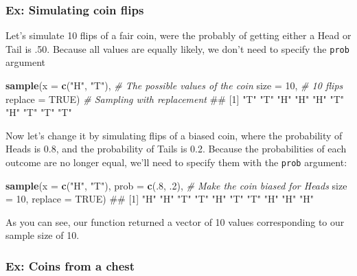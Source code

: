 \documentclass[]{book}
\newenvironment{Shaded}{\begin{snugshade}}{\end{snugshade}}
\newcommand{\KeywordTok}[1]{\textcolor[rgb]{0.13,0.29,0.53}{\textbf{{#1}}}}
\newcommand{\DataTypeTok}[1]{\textcolor[rgb]{0.13,0.29,0.53}{{#1}}}
\newcommand{\DecValTok}[1]{\textcolor[rgb]{0.00,0.00,0.81}{{#1}}}
\newcommand{\StringTok}[1]{\textcolor[rgb]{0.31,0.60,0.02}{{#1}}}
\newcommand{\CommentTok}[1]{\textcolor[rgb]{0.56,0.35,0.01}{\textit{{#1}}}}
\newcommand{\OtherTok}[1]{\textcolor[rgb]{0.56,0.35,0.01}{{#1}}}
\newcommand{\NormalTok}[1]{{#1}}
\theoremstyle{definition}
\theoremstyle{definition}
\theoremstyle{remark}
\begin{document}
\subsubsection{Ex: Simulating coin
flips}\label{ex-simulating-coin-flips}

Let's simulate 10 flips of a fair coin, were the probably of getting
either a Head or Tail is .50. Because all values are equally likely, we
don't need to specify the \texttt{prob} argument

\begin{Shaded}
\begin{Highlighting}[]
\KeywordTok{sample}\NormalTok{(}\DataTypeTok{x =} \KeywordTok{c}\NormalTok{(}\StringTok{"H"}\NormalTok{, }\StringTok{"T"}\NormalTok{), }\CommentTok{# The possible values of the coin}
       \DataTypeTok{size =} \DecValTok{10}\NormalTok{,  }\CommentTok{# 10 flips}
       \DataTypeTok{replace =} \OtherTok{TRUE}\NormalTok{) }\CommentTok{# Sampling with replacement}
\NormalTok{##  [1] "T" "T" "H" "H" "H" "T" "H" "T" "T" "T"}
\end{Highlighting}
\end{Shaded}

Now let's change it by simulating flips of a biased coin, where the
probability of Heads is 0.8, and the probability of Tails is 0.2.
Because the probabilities of each outcome are no longer equal, we'll
need to specify them with the \texttt{prob} argument:

\begin{Shaded}
\begin{Highlighting}[]
\KeywordTok{sample}\NormalTok{(}\DataTypeTok{x =} \KeywordTok{c}\NormalTok{(}\StringTok{"H"}\NormalTok{, }\StringTok{"T"}\NormalTok{),}
       \DataTypeTok{prob =} \KeywordTok{c}\NormalTok{(.}\DecValTok{8}\NormalTok{, .}\DecValTok{2}\NormalTok{), }\CommentTok{# Make the coin biased for Heads}
       \DataTypeTok{size =} \DecValTok{10}\NormalTok{,}
       \DataTypeTok{replace =} \OtherTok{TRUE}\NormalTok{)}
\NormalTok{##  [1] "H" "H" "T" "T" "H" "T" "T" "H" "H" "H"}
\end{Highlighting}
\end{Shaded}

As you can see, our function returned a vector of 10 values
corresponding to our sample size of 10.

\subsubsection{Ex: Coins from a chest}\label{ex-coins-from-a-chest}
\end{document}
